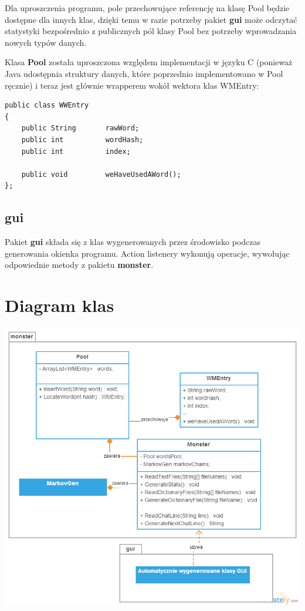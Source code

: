 \documentclass{article}
\begin{document}
Dla uproszczenia programu, pole przechowujące referencję na klasę Pool będzie dostępne
dla innych klas, dzięki temu w razie potrzeby pakiet \textbf{gui} może odczytać statystyki bezpośrednio z publicznych pól klasy Pool bez potrzeby wprowadzania nowych typów danych.

Klasa \textbf{Pool} została uproszczona względem implementacji w języku C
(ponieważ Java udostępnia struktury danych, które poprzednio implementowano w Pool
ręcznie) i teraz jest głównie wrapperem wokół wektora klas WMEntry:

\begin{lstlisting}[frame=single]
public class WWEntry
{
	public String		rawWord;
	public int			wordHash;
	public int			index;
	
	public void			weHaveUsedAWord();
};
\end{lstlisting}

\subsection{gui}

Pakiet \textbf{gui} składa się z klas wygenerowanych przez środowisko podczas generowania okienka programu. Action listenery wykonują operacje, wywołując odpowiednie metody z pakietu \textbf{monster}.


\section{Diagram klas}

\includegraphics[width=\textwidth]{MMChat_diag.png}
\end{document}
